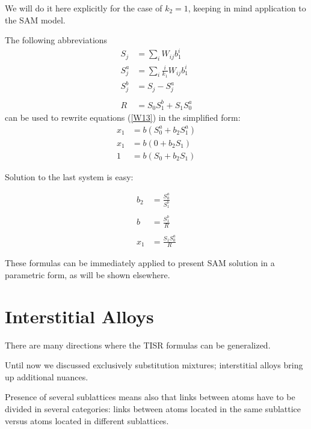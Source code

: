 \documentclass[12pt,abstract]{scrartcl}
\begin{document}
We will do it here explicitly for the case of $k_2 = 1$, keeping in mind application to the SAM model.

The following abbreviations
\begin{equation} \label{S3}
\begin{split}
S_j &= \sum_i W_{i j} b_1^i\\
S_j^a &= \sum_i \frac{i}{k_1}W_{i j} b_1^i\\
S_j^b &=S_j - S_j^a \\
\\
R &= S_0 S_1^b + S_1 S_0^a
\end{split}
\end{equation}
can be used to rewrite equations  (\ref{W13}) in the simplified form:
\begin{equation} \label{S4}
\begin{split}
x_1 &= b (S_0^a + b_2 S_1^a )\\
x_1 &= b (0 + b_2 S_1)\\
1 &= b (S_0 + b_2 S_1)
\end{split}
\end{equation}

Solution to the last system is easy:

\begin{equation} \label{S5}
\begin{split}
b_2 &= \frac{S_0^a}{S_1^b} \\
\\
b &= \frac{S_1^b}{R}\\
\\
x_1 &= \frac{S_1 S_0^a}{R}
\end{split}
\end{equation}

These formulas can be immediately applied to present SAM solution in a parametric form, as will be shown elsewhere.


\section{Interstitial Alloys}

There are many directions where the TISR formulas can be generalized.

Until now we discussed exclusively substitution mixtures; interstitial alloys \cite{haidemenopoulos2018} bring up additional nuances.

Presence of several sublattices means also that links between atoms have to be divided in several categories: links between atoms located in the same sublattice versus atoms located in different sublattices.
\end{document}
